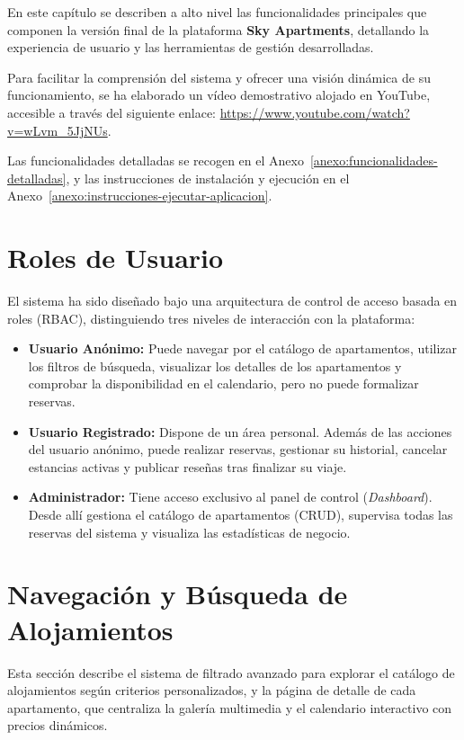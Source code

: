 En este capítulo se describen a alto nivel las funcionalidades principales que componen la versión final de la plataforma \textbf{Sky Apartments}, detallando la experiencia de usuario y las herramientas de gestión desarrolladas. 

Para facilitar la comprensión del sistema y ofrecer una visión dinámica de su funcionamiento, se ha elaborado un vídeo demostrativo alojado en YouTube, accesible a través del siguiente enlace:
\newline
\url{https://www.youtube.com/watch?v=wLvm_5JjNUs}.

Las funcionalidades detalladas se recogen en el Anexo~\ref{anexo:funcionalidades-detalladas}, y las instrucciones de instalación y ejecución en el Anexo~\ref{anexo:instrucciones-ejecutar-aplicacion}.
\section{Roles de Usuario}
El sistema ha sido diseñado bajo una arquitectura de control de acceso basada en roles (RBAC), distinguiendo tres niveles de interacción con la plataforma:
\begin{itemize}
    \item \textbf{Usuario Anónimo:} Puede navegar por el catálogo de apartamentos, utilizar los filtros de búsqueda, visualizar los detalles de los apartamentos y comprobar la disponibilidad en el calendario, pero no puede formalizar reservas.
    \item \textbf{Usuario Registrado:} Dispone de un área personal. Además de las acciones del usuario anónimo, puede realizar reservas, gestionar su historial, cancelar estancias activas y publicar reseñas tras finalizar su viaje.
    \item \textbf{Administrador:} Tiene acceso exclusivo al panel de control (\textit{Dashboard}). Desde allí gestiona el catálogo de apartamentos (CRUD), supervisa todas las reservas del sistema y visualiza las estadísticas de negocio.
\end{itemize}

\section{Navegación y Búsqueda de Alojamientos}
Esta sección describe el sistema de filtrado avanzado para explorar el catálogo de alojamientos según criterios personalizados, y la página de detalle de cada apartamento, que centraliza la galería multimedia y el calendario interactivo con precios dinámicos.
